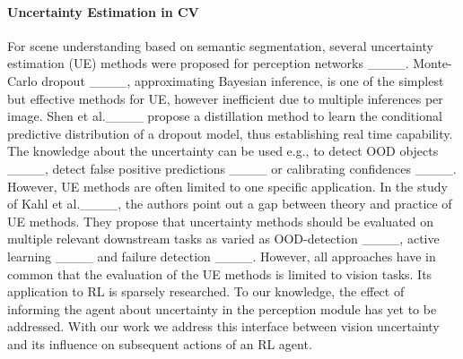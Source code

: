 \paragraph{Uncertainty Estimation in CV}
For scene understanding based on semantic segmentation, several uncertainty estimation (UE) methods were proposed for perception networks ____. 
Monte-Carlo dropout ____, approximating Bayesian inference, is one of the simplest but effective methods for UE, however inefficient due to multiple inferences per image. 
Shen et al.____ propose a distillation method to learn the conditional predictive distribution of a dropout model, thus establishing real time capability. 
The knowledge about the uncertainty can  be used e.g., to detect OOD objects ____, detect false positive predictions ____ or calibrating confidences ____. However, UE methods are often limited to one specific application. 
In the study of Kahl et al.____, the authors point out a gap between theory and practice of UE methods. They propose that uncertainty methods should be evaluated on multiple relevant downstream tasks as varied as OOD-detection ____, active learning ____ and failure detection ____.
However, all approaches have in common that the evaluation of the UE methods is limited to vision tasks. Its application to RL is sparsely researched.
To our knowledge, the effect of informing the agent about uncertainty in the perception module 
has yet to be addressed.
With our work we address this interface between vision uncertainty and its influence on subsequent actions of an RL agent.